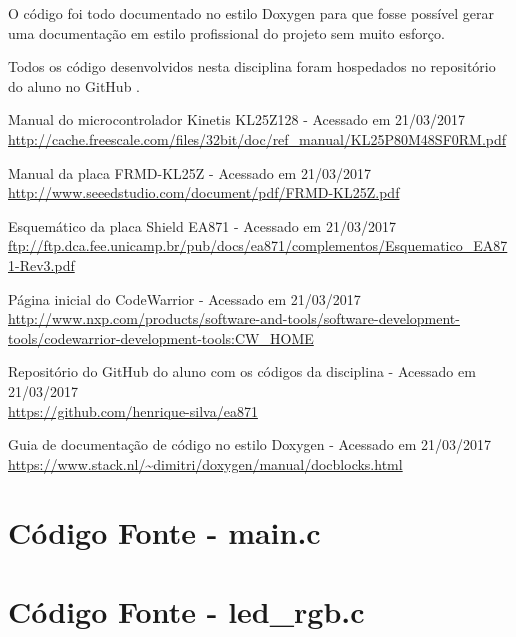 \documentclass{article}
\begin{document}
O código foi todo documentado no estilo Doxygen \cite{doxygen} para que fosse possível gerar uma documentação em estilo profissional do projeto sem muito esforço.

Todos os código desenvolvidos nesta disciplina foram hospedados no repositório do aluno no GitHub \cite{github}.

\clearpage
\begin{thebibliography}{9} %

  Manual do microcontrolador Kinetis KL25Z128 - Acessado em 21/03/2017\\
  \url{http://cache.freescale.com/files/32bit/doc/ref_manual/KL25P80M48SF0RM.pdf}

  Manual da placa FRMD-KL25Z - Acessado em 21/03/2017\\
  \url{http://www.seeedstudio.com/document/pdf/FRMD-KL25Z.pdf}

  Esquemático da placa Shield EA871 - Acessado em 21/03/2017\\
  \url{ftp://ftp.dca.fee.unicamp.br/pub/docs/ea871/complementos/Esquematico_EA871-Rev3.pdf}

  Página inicial do CodeWarrior - Acessado em 21/03/2017\\
  \url{http://www.nxp.com/products/software-and-tools/software-development-tools/codewarrior-development-tools:CW_HOME}

  Repositório do GitHub do aluno com os códigos da disciplina - Acessado em 21/03/2017\\
  \url{https://github.com/henrique-silva/ea871}

  Guia de documentação de código no estilo Doxygen - Acessado em 21/03/2017\\
  \url{https://www.stack.nl/~dimitri/doxygen/manual/docblocks.html}

\end{thebibliography}

\clearpage
\appendix
\section{Código Fonte - main.c}


\clearpage
\section{Código Fonte - led\_rgb.c}

\end{document}
